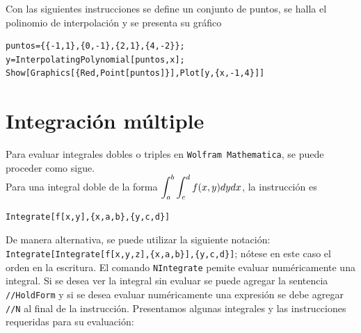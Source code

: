       Con las siguientes instrucciones se define un conjunto de puntos, se halla
      el polinomio de interpolación y se presenta su gráfico
      \begin{tcolorbox}
\begin{Verbatim}[formatcom=\letraverbatim]
puntos={{-1,1},{0,-1},{2,1},{4,-2}};
y=InterpolatingPolynomial[puntos,x];
Show[Graphics[{Red,Point[puntos]}],Plot[y,{x,-1,4}]]
\end{Verbatim}
      \end{tcolorbox}

      \section{Integración múltiple}
      Para evaluar integrales dobles o triples en \verb"Wolfram Mathematica",
      se puede proceder como sigue.\\[0.2cm]
      Para una integral doble de la forma
      $\displaystyle \int_a^b \int_c^d f(x,y)dydx$, la instrucción es
      \begin{tcolorbox}[title=Integrales dobles]
\begin{Verbatim}[formatcom=\letraverbatim]
Integrate[f[x,y],{x,a,b},{y,c,d}]
\end{Verbatim}
      \end{tcolorbox}
      De manera alternativa, se puede utilizar la siguiente notación:\\
      \verb"Integrate[Integrate[f[x,y,z],{x,a,b}],{y,c,d}]"; nótese en este caso el orden en la escritura.
      El comando \verb"NIntegrate" pemite evaluar numéricamente una integral. 
      Si se desea ver la integral sin evaluar se puede
      agregar la sentencia \verb"//HoldForm" y si se desea evaluar numéricamente una expresión se debe agregar
      \verb"//N" al final de la instrucción. Presentamos algunas integrales y las instrucciones requeridas para su evaluación:
